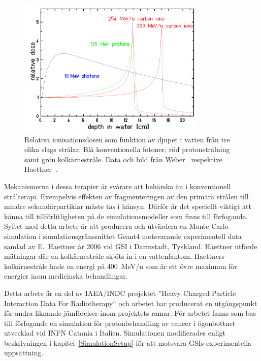 \begin{figure}[!h]
\begin{center}
\includegraphics[width=0.8\textwidth]{images/DosesFromHaettner.png}  
\caption{\label{fig:DosesFromHaettnerSvenska}Relativa ionisationsdosen som funktion av djupet i vatten från tre olika slags strålar. Blå konventionella fotoner, röd protonstrålning samt grön kolkärnestråle. Data och bild från Weber~\cite{weber} respektive Haettner~\cite{ehaettner}.} 
\end{center}
\end{figure} 

Mekanismerna i dessa terapier är svårare att behärska än i konventionell strålterapi. Exempelvis effekten av fragmenteringen av den primära strålen till mindre sekundärpartiklar måste tas i hänsyn. Därför är det speciellt viktigt att känna till tillförlitligheten på de simulationsmodeller som finns till förfogande. Syftet med detta arbete är att producera och utvärdera en Monte Carlo simulation i simulationsgränssnittet Geant4 motsvarande experimentell data samlad av E.~Haettner år 2006 vid GSI i Darmstadt, Tyskland. Haettner utförde mätningar där en kolkärnestråle skjöts in i en vattenfantom. Haettners kolkärnestråle hade en energi på 400~MeV/u som är ett övre maximum för energier inom medicinska behandlingar.

Detta arbete är en del av IAEA/INDC projektet ''Heavy Charged-Particle Interaction Data For Radiotherapy`` och arbetet har producerat en utgångspunkt för andra liknande jämförelser inom projektets ramar. För arbetet fanns som bas till förfogande en simulation för protonbehandling av cancer i ögonbottnet utvecklad vid INFN Catania i Italien. Simulationen modifierades enligt beskrivningen i kapitel~\ref{SimulationSetup} för att motsvara GSIs experimentella uppsättning.

